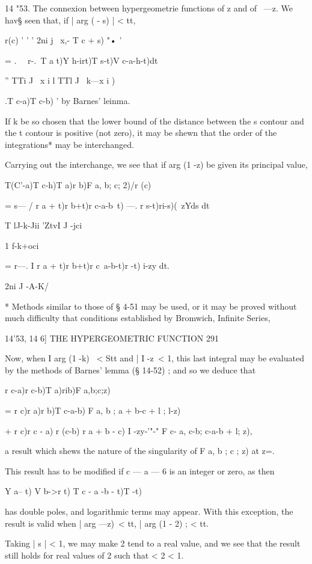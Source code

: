 14 "53. The connexion between hypergeometrie functions of z and of \
—z. We hav§ seen that, if | arg ( - s) | < tt,

r(c) ' ' ' 2ni j \ x,- T c + s) "• '

= . \ \ r-.\ T a t)Y h-irt)T s-t)V c-a-h-t)dt\

'' TTi J \ x i l TTl J ~k—x i )

.T c-a)T c-b) ' by Barnes' leinma.

If k be so chosen that the lower bound of the distance between the s
contour and the t contour is positive (not zero), it may be shewn that
the order of the integrations* may be interchanged.

Carrying out the interchange, we see that if arg (1 -z) be given its
principal value,

T(C'-a)T c-h)T a)r b)F a, b; c; 2)/r (c)

= s— / r a + t)r b+t)r c-a-b~t) —. r s-t)ri-s)(~zYds dt

 T lJ-k-Jii 'ZtvI J -jci

1 f-k+oci

= r—. I r a + t)r b+t)r c~a-b-t)r -t) i-zy dt.

2ni J -A-K/

* Methods similar to those of § 4-51 may be used, or it may be proved
without much difficulty that conditions established by Bromwich,
Infinite Series, %



14'53, 14 6] THE HYPERGEOMETRIC FUNCTION 291

Now, when I arg (1 -k) \ < Stt and | I -z\ < 1, this last integral may
be evaluated by the methods of Barnes' lemma (§ 14-52) ; and so we
deduce that

r c-a)r c-b)T a)rib)F a,b;c;z)

= r c)r a)r b)T c-a-b) F a, b ; a + b-c + l ; l-z)

+ r c)r c - a) r (c-b) r a + b - c) I -zy-'"-" F c- a, c-b; c-a-b + l;
z),

a result which shews the nature of the singularity of F a, b ; c ; z)
at z=.

This result has to be modified if c — a — 6 is an integer or zero, as
then

Y a-- t) V b->r t) T c - a -b - t)T -t)

has double poles, and logarithmic terms may appear. With this
exception, the result is valid when | arg —z)\ < tt, | arg (1 - 2) ; <
tt.

Taking | s | < 1, we may make 2 tend to a real value, and we see that
the result still holds for real values of 2 such that < 2 < 1.

